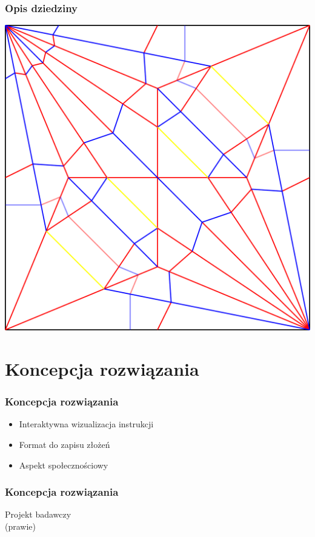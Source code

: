 \documentclass{beamer}
\begin{document}
\begin{frame}
  \frametitle{Opis dziedziny}
	  \centering
	\includegraphics[width=0.7\linewidth]{assets/crane-crease-pattern.png}
\end{frame}

\section{Koncepcja rozwiązania}
\begin{frame}
  \frametitle{Koncepcja rozwiązania}
  \begin{itemize}
	  \item Interaktywna wizualizacja instrukcji
	  \item Format do zapisu złożeń
	  \item Aspekt społecznościowy
  \end{itemize}
\end{frame}

\begin{frame}
  \frametitle{Koncepcja rozwiązania}
	\centering
	  \Huge{Projekt badawczy}
	  \\
	  \small{(prawie)}
\end{frame}
\end{document}
